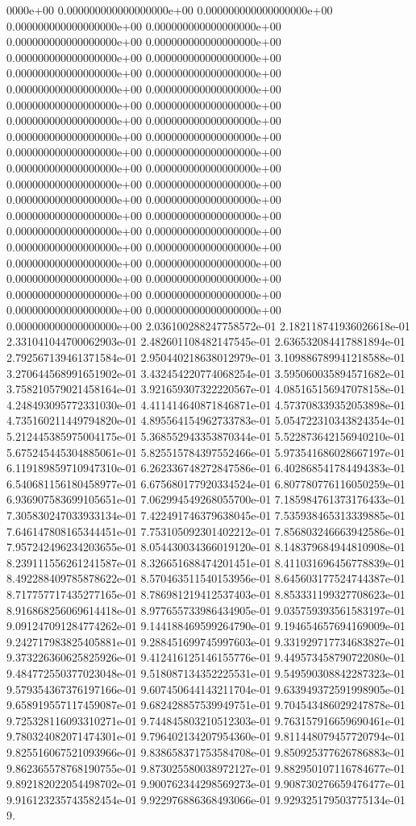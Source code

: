 0000e+00	0.000000000000000000e+00	0.000000000000000000e+00	0.000000000000000000e+00	0.000000000000000000e+00	0.000000000000000000e+00	0.000000000000000000e+00	0.000000000000000000e+00	0.000000000000000000e+00	0.000000000000000000e+00	0.000000000000000000e+00	0.000000000000000000e+00	0.000000000000000000e+00	0.000000000000000000e+00	0.000000000000000000e+00	0.000000000000000000e+00	0.000000000000000000e+00	0.000000000000000000e+00	0.000000000000000000e+00	0.000000000000000000e+00	0.000000000000000000e+00	0.000000000000000000e+00	0.000000000000000000e+00	0.000000000000000000e+00	0.000000000000000000e+00	0.000000000000000000e+00	0.000000000000000000e+00	0.000000000000000000e+00	0.000000000000000000e+00	0.000000000000000000e+00	0.000000000000000000e+00	0.000000000000000000e+00	0.000000000000000000e+00	0.000000000000000000e+00	0.000000000000000000e+00	0.000000000000000000e+00	0.000000000000000000e+00	0.000000000000000000e+00	0.000000000000000000e+00	0.000000000000000000e+00	0.000000000000000000e+00	0.000000000000000000e+00	2.036100288247758572e-01	2.182118741936026618e-01	2.331041044700062903e-01	2.482601108482147545e-01	2.636532084417881894e-01	2.792567139461371584e-01	2.950440218638012979e-01	3.109886789941218588e-01	3.270644568991651902e-01	3.432454220774068254e-01	3.595060035894571682e-01	3.758210579021458164e-01	3.921659307322220567e-01	4.085165156947078158e-01	4.248493095772331030e-01	4.411414640871846871e-01	4.573708339352053898e-01	4.735160211449794820e-01	4.895564154962733783e-01	5.054722310343824354e-01	5.212445385975004175e-01	5.368552943353870344e-01	5.522873642156940210e-01	5.675245445304885061e-01	5.825515784397552466e-01	5.973541686028667197e-01	6.119189859710947310e-01	6.262336748272847586e-01	6.402868541784494383e-01	6.540681156180458977e-01	6.675680177920334524e-01	6.807780776116050259e-01	6.936907583699105651e-01	7.062994549268055700e-01	7.185984761373176433e-01	7.305830247033933134e-01	7.422491746379638045e-01	7.535938465313339885e-01	7.646147808165344451e-01	7.753105092301402212e-01	7.856803246663942586e-01	7.957242496234203655e-01	8.054430034366019120e-01	8.148379684944810908e-01	8.239111556261241587e-01	8.326651688474201451e-01	8.411031696456778839e-01	8.492288409785878622e-01	8.570463511540153956e-01	8.645603177524744387e-01	8.717757717435277165e-01	8.786981219412537403e-01	8.853331199327708623e-01	8.916868256069614418e-01	8.977655733986434905e-01	9.035759393561583197e-01	9.091247091284774262e-01	9.144188469599264790e-01	9.194654657694169009e-01	9.242717983825405881e-01	9.288451699745997603e-01	9.331929717734683827e-01	9.373226360625825926e-01	9.412416125146155776e-01	9.449573458790722080e-01	9.484772550377023048e-01	9.518087134352225531e-01	9.549590308842287323e-01	9.579354367376197166e-01	9.607450644143211704e-01	9.633949372591998905e-01	9.658919557117459087e-01	9.682428857539949751e-01	9.704543486029247878e-01	9.725328116093310271e-01	9.744845803210512303e-01	9.763157916659690461e-01	9.780324082071474301e-01	9.796402134207954360e-01	9.811448079457720794e-01	9.825516067521093966e-01	9.838658371753584708e-01	9.850925377626786883e-01	9.862365578768190755e-01	9.873025580038972127e-01	9.882950107116784677e-01	9.892182022054498702e-01	9.900762344298569273e-01	9.908730276659476477e-01	9.916123235743582454e-01	9.922976886368493066e-01	9.929325179503775134e-01	9.